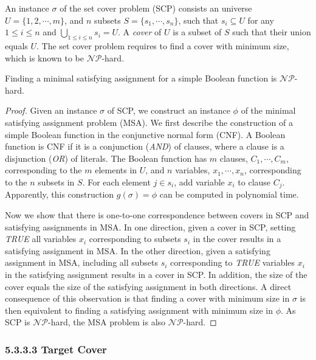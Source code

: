 An instance $\sigma$ of the set cover problem (SCP) consists an universe
$U = \{1, 2, \cdots, m\}$, and $n$ subsets $S = \{s_1, \cdots, s_n\}$,
such that $s_i \subseteq U$ for any $1\le i\le n$ and $\bigcup_{1\le
i\le n} s_i = U$. A \emph{cover} of $U$ is a subset of $S$ such that
their union equals $U$.
The set cover problem requires to find a cover with minimum size, which
is known to be $\mathcal{NP}$-hard.

\begin{theorem}
\label{THM:hardness}
Finding a minimal satisfying assignment for a simple Boolean function is $\mathcal{NP}$-hard.
\end{theorem}

\begin{proof}
Given an instance $\sigma$ of SCP, we construct an instance $\phi$ of
the minimal satisfying assignment problem (MSA). We first describe the
construction of a simple Boolean function in the conjunctive normal form
(CNF). A Boolean function is CNF if it is a conjunction (\emph{AND}) of
clauses, where a clause is a disjunction (\emph{OR}) of literals. The
Boolean function has $m$ clauses, $C_1, \cdots, C_m$, corresponding to
the $m$ elements in $U$, and $n$ variables, $x_1, \cdots, x_n$,
corresponding to the $n$ subsets in $S$. For each element $j \in s_i$,
add variable $x_i$ to clause $C_j$. Apparently, this construction
$g(\sigma) = \phi$ can be computed in polynomial time.

Now we show that there is one-to-one correspondence between covers in
SCP and satisfying assignments in MSA. In one direction, given a cover
in SCP, setting \emph{TRUE} all variables $x_i$ corresponding to subsets
$s_i$ in the cover results in a satisfying assignment in MSA. In the
other direction, given a satisfying assignment in MSA, including all
subsets $s_i$ corresponding to \emph{TRUE} variables $x_i$ in the
satisfying assignment results in a cover in SCP. In addition, the size
of the cover equals the size of the satisfying assignment in both
directions. A direct consequence of this observation is that finding a
cover with minimum size in $\sigma$ is then equivalent to finding a
satisfying assignment with minimum size in $\phi$. As SCP is
$\mathcal{NP}$-hard, the MSA problem is also $\mathcal{NP}$-hard.
\end{proof}

\subsubsection{5.3.3.3 \enskip Target Cover}

